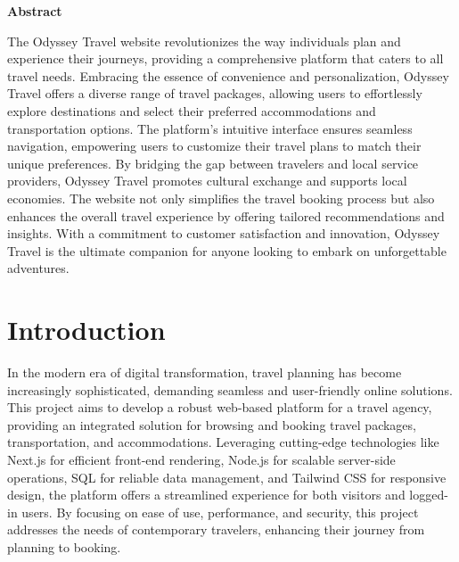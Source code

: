 \documentclass{scrreprt}
\begin{document}
\begin{center}
    \parbox{0.8\textwidth}{ 
        \centering
        \textbf{Abstract}
    }
\end{center}

The Odyssey Travel website revolutionizes the way individuals plan and experience their journeys, providing a comprehensive platform that caters to all travel needs. Embracing the essence of convenience and personalization, Odyssey Travel offers a diverse range of travel packages, allowing users to effortlessly explore destinations and select their preferred accommodations and transportation options. The platform’s intuitive interface ensures seamless navigation, empowering users to customize their travel plans to match their unique preferences. By bridging the gap between travelers and local service providers, Odyssey Travel promotes cultural exchange and supports local economies. The website not only simplifies the travel booking process but also enhances the overall travel experience by offering tailored recommendations and insights. With a commitment to customer satisfaction and innovation, Odyssey Travel is the ultimate companion for anyone looking to embark on unforgettable adventures.


\tableofcontents

\chapter{Introduction}
In the modern era of digital transformation, travel planning has become increasingly sophisticated, demanding seamless and user-friendly online solutions. This project aims to develop a robust web-based platform for a travel agency, providing an integrated solution for browsing and booking travel packages, transportation, and accommodations. Leveraging cutting-edge technologies like Next.js for efficient front-end rendering, Node.js for scalable server-side operations, SQL for reliable data management, and Tailwind CSS for responsive design, the platform offers a streamlined experience for both visitors and logged-in users. By focusing on ease of use, performance, and security, this project addresses the needs of contemporary travelers, enhancing their journey from planning to booking.
\end{document}

